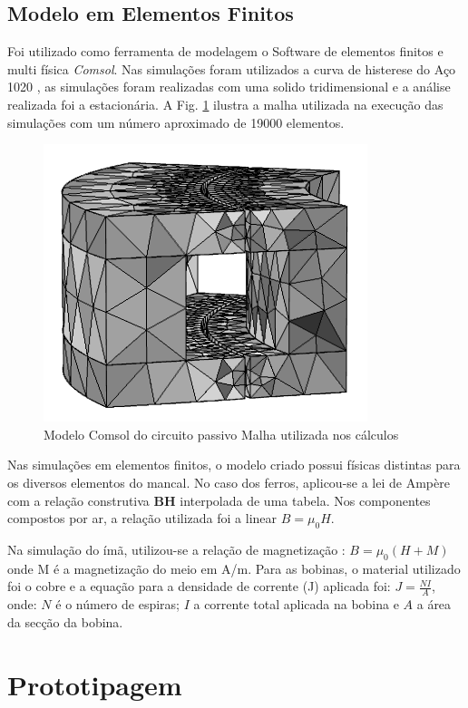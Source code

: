  \subsection{Modelo em Elementos Finitos}
 
 Foi utilizado como ferramenta de modelagem o Software de elementos finitos e multi física \textit{Comsol}. Nas simulações foram utilizados a curva de histerese do Aço 1020 , as simulações foram realizadas com uma solido tridimensional e a análise realizada foi a estacionária.  A Fig. \ref{Fig:Simulacao:Passivo:Mesh} ilustra a malha utilizada na execução das simulações com um número aproximado de 19000 elementos.
 
 \begin{figure}[!ht]
 	\centering
 	\includegraphics[width=0.5 \columnwidth,angle=0]{Figs/Simulacoes/Passivo/3D_Mesh=1,2.png}
 	\caption{Modelo Comsol do circuito passivo Malha utilizada nos cálculos}
 	\label{Fig:Simulacao:Passivo:Mesh}
 \end{figure}
 
Nas simulações em elementos finitos, o modelo criado possui físicas distintas para os diversos elementos do mancal. No caso dos ferros, aplicou-se a lei de Ampère com a relação construtiva \textbf{BH} interpolada de uma tabela. Nos componentes compostos por ar, a relação utilizada foi a linear $B=\mu_0 H$. 

Na simulação do ímã, utilizou-se a relação de magnetização : $B = \mu_0 (H + M)$ onde M é a magnetização do meio em A/m. Para as bobinas, o material utilizado foi o cobre e a equação para a densidade de corrente (J) aplicada foi: $ J = \frac{N I}{A}$, onde: $N$ é o número de espiras; $I$ a corrente total aplicada na bobina e $A$ a área da secção da bobina.



\section{Prototipagem}

